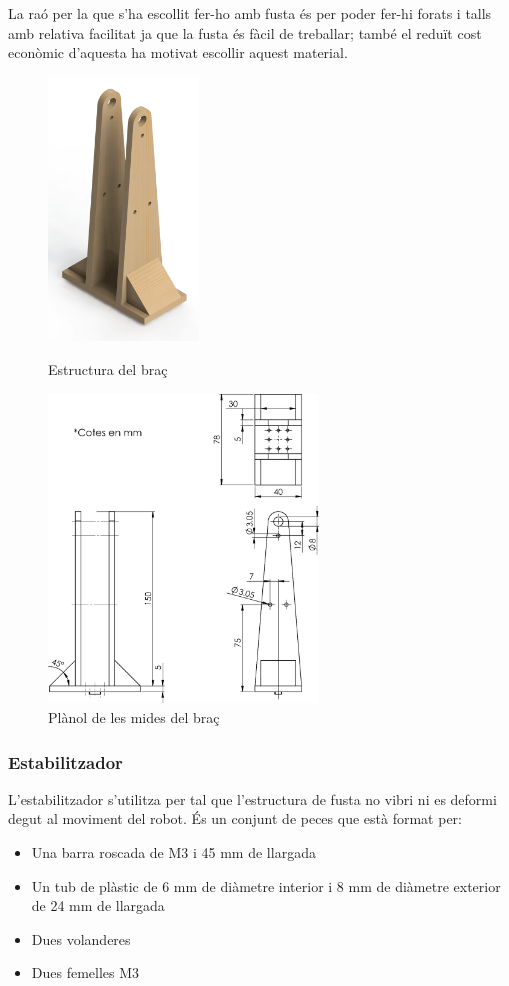 La raó per la que s'ha escollit fer-ho amb fusta és per poder fer-hi forats i talls amb relativa facilitat ja que la fusta és fàcil de treballar; també el reduït cost econòmic d'aquesta ha motivat escollir aquest material.
\begin{figure}[h!]
\begin{minipage}[b]{.45\linewidth}
\centering
\includegraphics[height=7cm]{./imgComp/estructura}
\caption{Estructura del braç}
\end{minipage}
\begin{minipage}[b]{.45\linewidth}
\centering
\includegraphics[height=8.2cm]{./sketch/estructura}
\caption{Plànol de les mides del braç}
\end{minipage}
\end{figure}

\subsubsection{Estabilitzador}
L'estabilitzador s'utilitza per tal que l'estructura de fusta no vibri ni es deformi degut al moviment del robot. 
És un conjunt de peces que està format per:
\begin{itemize}
\item Una barra roscada de M3 i 45 mm de llargada

\item Un tub de plàstic de 6 mm de diàmetre interior i 8 mm de diàmetre exterior de 24 mm de llargada

\item Dues volanderes

\item Dues femelles M3
\end{itemize}

